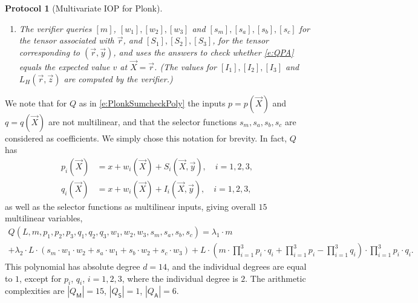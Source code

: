 \documentclass[11pt]{article}
\newtheorem{protocol}[]{Protocol}
\theoremstyle{definition}
\theoremstyle{remark}
\begin{document}
\begin{protocol}[Multivariate IOP for Plonk]
\begin{enumerate}
\item
The verifier queries $[m]$, $[w_1], [w_2], [w_3]$ and $[s_m], [s_a], [s_b], [s_c]$ for the tensor associated with $\vec r$,  and $[S_1], [S_2], [S_3]$,  for the tensor corresponding to $(\vec r, \vec y)$,
and uses the answers 
to check whether \eqref{e:QPA} equals the expected value $v$ at $\vec X = \vec r$. 
(The values for $[I_1], [I_2], [I_3]$ and $L_H(\vec r, \vec z)$ are computed by the verifier.)
\end{enumerate}
\end{protocol}

We note that for $Q$ as in \eqref{e:PlonkSumcheckPoly} the inputs $p= p(\vec X)$ and $q= q(\vec X)$ are not multilinear, and that the selector functions $s_m, s_a, s_b, s_c$ are considered as coefficients.
We simply chose this notation for brevity. 
In fact, $Q$ has  
\begin{align}
\label{e:pi}
p_i (\vec X) &= x + w_i(\vec X) + S_i(\vec X, \vec y),\quad i=1,2,3,
\\
\label{e:qi}
q_i (\vec X) &= x + w_i(\vec X) + I_i(\vec X, \vec y), \quad i=1,2,3,
\end{align}
as well as the selector functions as multilinear inputs, giving overall $15$ multilinear variables, 
\begin{multline*}
Q(L, m, p_1,p_2,p_3,q_1,q_2, q_3, w_1,w_2, w_3, s_m, s_a, s_b, s_c) = \lambda_1 \cdot m
\\
+ \lambda_2 \cdot L \cdot \left( s_m \cdot w_1\cdot w_2 + s_a \cdot w_1 + s_b \cdot w_2 + s_c\cdot w_3\right)
+ L \cdot  \left(m\cdot \prod_{i=1}^3 p_i\cdot q_i  + \prod_{i=1}^3 p_i - \prod_{i=1}^3 q_i\right)\cdot \prod_{i=1}^3 p_i\cdot q_i.
\end{multline*}
This polynomial has absolute degree $d= 14$, and the individual degrees are equal to $1$, except for $p_i$, $q_i$, $i=1,2,3$, where the individual degree is $2$.
The arithmetic complexities are $|Q_\mathsf M| = 15$, $|Q_\mathsf S| = 1$, $|Q_\mathsf A |= 6$.
\end{document}
